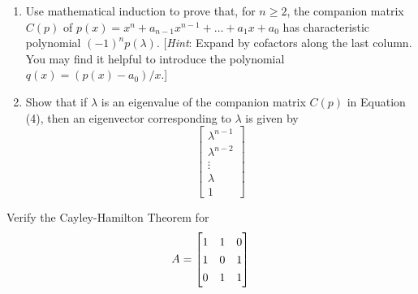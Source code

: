 \documentclass[12pt,letterpaper]{hmcpset}
\newcommand{\m}[1]{\renewcommand*{\arraystretch}{1.3} \begin{bmatrix} #1 \end{bmatrix}}
\begin{document}
\begin{solution}
\vfill
\end{solution}
\newpage

\begin{problem}[4.3.32]
	\begin{enumerate}
		\item
			Use mathematical induction to prove that, for $n \geq 2$, the companion matrix $C(p)$ of $p(x) = x^n + a_{n-1}x^{n-1} + \dots + a_1x + a_0$ has characteristic polynomial $(-1)^np(\lambda)$. [\emph{Hint}: Expand by cofactors along the last column. You may find it helpful to introduce the polynomial $q(x) = (p(x) -a_0)/x$.]
		
		\item
			Show that if $\lambda$ is an eigenvalue of the companion matrix $C(p)$ in Equation (4), then an eigenvector corresponding to $\lambda$ is given by
			$$\m{\lambda^{n-1}\\\lambda^{n-2}\\ \vdots \\ \lambda \\ 1}$$
	\end{enumerate}

\end{problem}

\begin{solution}
\vfill
\end{solution}
\newpage

\begin{problem}[4.3.34]
Verify the Cayley-Hamilton Theorem for
$$ A = \m{1 & 1 & 0 \\ 1 & 0 & 1 \\ 0 & 1 & 1}$$
\end{problem}

\begin{solution}
\vfill
\end{solution}
\end{document}
